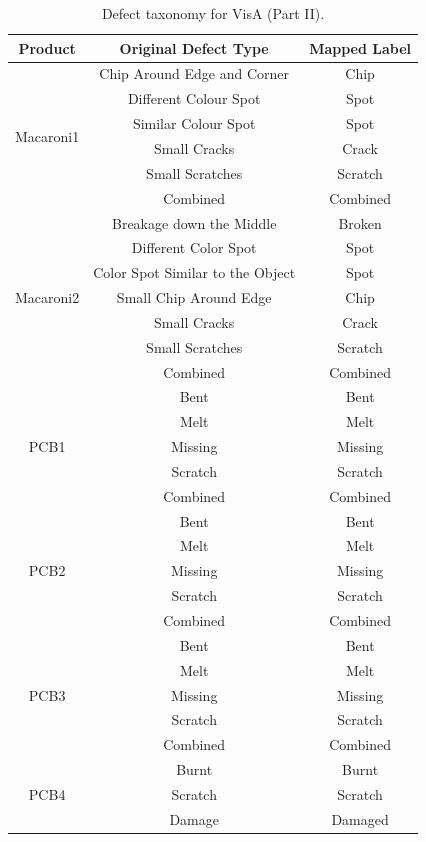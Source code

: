 \begin{table}
\centering
\footnotesize
\caption{Defect taxonomy for VisA (Part II).}
\label{tab:visa-mapping2}
\begin{tabular}{@{}ccc@{}}
\toprule
\textbf{Product} & \textbf{Original Defect Type} & \textbf{Mapped Label} \\
\midrule
\multirow{6}{*}{Macaroni1} & Chip Around Edge and Corner & Chip \\
 & Different Colour Spot & Spot \\
 & Similar Colour Spot & Spot \\
 & Small Cracks & Crack \\
 & Small Scratches & Scratch \\
 & Combined & Combined \\
\midrule
\multirow{7}{*}{Macaroni2} & Breakage down the Middle & Broken \\
 & Different Color Spot & Spot \\
 & Color Spot Similar to the Object & Spot \\
 & Small Chip Around Edge & Chip \\
 & Small Cracks & Crack \\
 & Small Scratches & Scratch \\
 & Combined & Combined \\
\midrule
\multirow{5}{*}{PCB1} & Bent & Bent \\
 & Melt & Melt \\
 & Missing & Missing \\
 & Scratch & Scratch \\
 & Combined & Combined \\
\midrule
\multirow{5}{*}{PCB2} & Bent & Bent \\
 & Melt & Melt \\
 & Missing & Missing \\
 & Scratch & Scratch \\
 & Combined & Combined \\
\midrule
\multirow{5}{*}{PCB3} & Bent & Bent \\
 & Melt & Melt \\
 & Missing & Missing \\
 & Scratch & Scratch \\
 & Combined & Combined \\
\midrule
\multirow{7}{*}{PCB4} & Burnt & Burnt \\
 & Scratch & Scratch \\
 & Damage & Damaged \\

\end{tabular}
\end{table}
